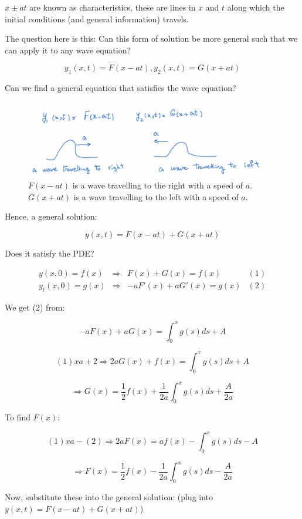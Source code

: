 \documentclass{article}
\begin{document}
$x \pm at$ are known as characteristics, these are lines in $x$ and $t$ along which the initial conditions (and general information) travels. 

The question here is this: Can this form of solution be more general such that we can apply it to any wave equation?

$$y_1 (x,t) = F(x-at), y_2(x,t) = G(x+at)$$

Can we find a general equation that satisfies the wave equation?


\begin{figure}[ht]
    \centering
    \includegraphics[width = 0.9 \textwidth]{image1.png}
    \caption{$F(x-at)$ is a wave travelling to the right with a speed of $a$. $G(x+at)$ is a wave travelling to the left with a speed of $a$. }
    \label{fig:Wave_directions}
\end{figure}

Hence, a general solution:

$$y(x,t) = F(x-at) + G(x+at)$$

Does it satisfy the PDE?

$$\begin{matrix} y(x,0) = f(x) & \Rightarrow & F(x) + G(x) = f(x) & (1)\\ y_t(x,0) = g(x) & \Rightarrow & -a F'(x) + a G'(x) = g(x) & (2) \end{matrix}$$

We get (2) from:

$$-a F(x) + a G(x) = \int_0^x g(s) ds + A$$

$$(1) xa + 2 \Rightarrow 2aG(x) + f(x) = \int_0^x g(s) ds + A$$

$$\Rightarrow G(x) = \frac{1}{2} f(x) + \frac{1}{2a} \int_0^x g(s) ds + \frac{A}{2a}$$

To find $F(x)$:

$$(1) xa - (2) \Rightarrow 2a F(x) = a f(x) - \int_0^x g(s) ds - A$$

$$\Rightarrow F(x) = \frac{1}{2} f(x) - \frac{1}{2a} \int_0^x g(s) ds - \frac{A}{2a}$$

Now, substitute these into the general solution: (plug into $y(x,t) = F(x-at) + G(x+at)$)
\end{document}
